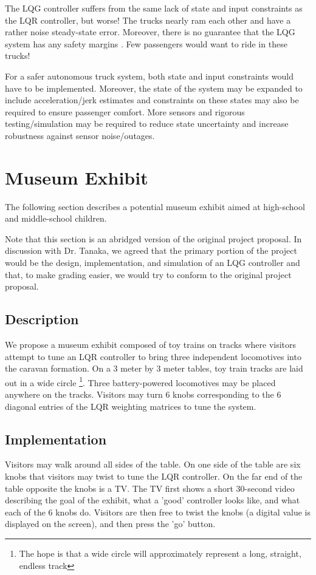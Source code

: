 \documentclass[12pt,onecolumn,reqno]{amsart}
\begin{document}
The LQG controller suffers from the same lack of state and input constraints as
the LQR controller, but worse! The trucks nearly ram each other and have a
rather noise steady-state error. Moreover, there is no guarantee that the LQG
system has any safety margins \cite{doyle1978guaranteed}. Few passengers would
want to ride in these trucks!

For a safer autonomous truck system, both state and input constraints would have
to be implemented. Moreover, the state of the system may be expanded to include
acceleration/jerk estimates and constraints on these states may also be required
to ensure passenger comfort. More sensors and rigorous testing/simulation may be
required to reduce state uncertainty and increase robustness against sensor
noise/outages.


\section{Museum Exhibit}
The following section describes a potential museum exhibit aimed at high-school
and middle-school children.

Note that this section is an abridged version of the original project proposal.
In discussion with Dr. Tanaka, we agreed that the primary portion of the project
would be the design, implementation, and simulation of an LQG controller and
that, to make grading easier, we would try to conform to the original project
proposal.

\subsection{Description}
We propose a museum exhibit composed of toy trains on tracks where visitors
attempt to tune an LQR controller to bring three independent locomotives into
the caravan formation. On a 3 meter by 3 meter tables, toy train tracks are laid
out in a wide circle \footnote {The hope is that a wide circle will
approximately represent a long, straight, endless track}. Three battery-powered
locomotives may be placed anywhere on the tracks. Visitors may turn 6 knobs
corresponding to the 6 diagonal entries of the LQR weighting matrices to tune
the system.


\subsection{Implementation}
Visitors may walk around all sides of the table. On one side of the table are
six knobs that visitors may twist to tune the LQR controller. On the far end of
the table opposite the knobs is a TV. The TV first shows a short 30-second video
describing the goal of the exhibit, what a 'good' controller looks like, and
what each of the 6 knobs do. Visitors are then free to twist the knobs (a
digital value is displayed on the screen), and then press the 'go' button.
\end{document}
